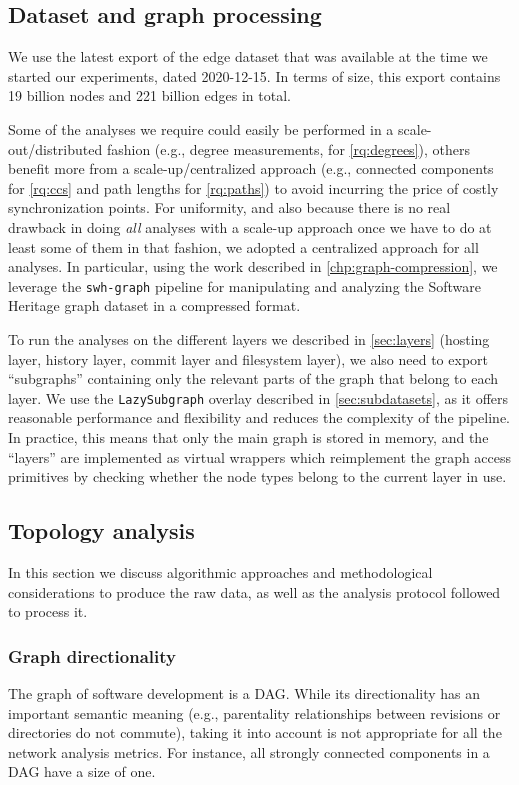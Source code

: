 \subsection{Dataset and graph processing}

We use the latest export of the edge dataset that was available at the time we
started our experiments, dated 2020-12-15. In terms of size, this export
contains 19 billion nodes and 221 billion edges in total.

Some of the analyses we require could easily be performed in a
scale-out/distributed fashion (e.g., degree measurements, for
\cref{rq:degrees}), others benefit more from a scale-up/centralized approach
(e.g., connected components for \cref{rq:ccs} and path lengths for
\cref{rq:paths}) to avoid incurring the price of costly synchronization points.
For uniformity, and also because there is no real drawback in doing \emph{all}
analyses with a scale-up approach once we have to do at least some of them in
that fashion, we adopted a centralized approach for all analyses.
In particular, using the work described in \cref{chp:graph-compression}, we
leverage the \texttt{swh-graph} pipeline for manipulating and analyzing the
Software Heritage graph dataset in a compressed format.

To run the analyses on the different layers we described in \cref{sec:layers}
(hosting layer, history layer, commit layer and filesystem layer), we also need
to export ``subgraphs'' containing only the relevant parts of the graph that
belong to each layer. We use the \texttt{LazySubgraph} overlay described in
\cref{sec:subdatasets}, as it offers reasonable performance and flexibility and
reduces the complexity of the pipeline.  In practice, this means that only the
main graph is stored in memory, and the ``layers'' are implemented as virtual
wrappers which reimplement the graph access primitives by checking whether the
node types belong to the current layer in use.

\subsection{Topology analysis}

In this section we discuss algorithmic approaches and methodological
considerations to produce the raw data, as well as the analysis protocol
followed to process it.

\subsubsection{Graph directionality}
The graph of software development is a \gls{DAG}. While its
directionality has an important semantic meaning (e.g., parentality
relationships between revisions or directories do not commute), taking it into
account is not appropriate for all the network analysis metrics.
For instance, all strongly connected components in a DAG have a size of one.

